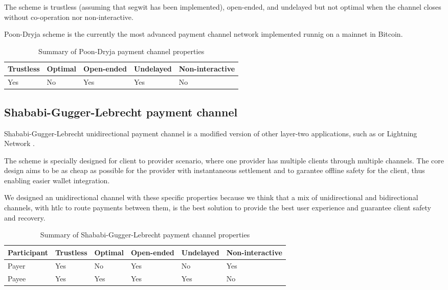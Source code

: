 \documentclass{llncs}
\begin{document}
The scheme is trustless (assuming that \gls{segwit} has been implemented), open-ended, and undelayed but not optimal when the channel closes without co-operation nor non-interactive.

Poon-Dryja scheme is the currently the most advanced payment channel network implemented runnig on a mainnet in Bitcoin.

\begin{table}[ht]
  \begin{tabularx}{\textwidth}{ | X | l | l | l | X |}
  \hline
  Trustless & Optimal & Open-ended & Undelayed & Non-interactive \\
  \hline \hline
  Yes & No & Yes & Yes & No \\
  \hline
  \end{tabularx}
  \caption{Summary of Poon-Dryja payment channel properties}
  \label{fig:summaryPoonDryjaPaymentChannel}
\end{table}

\subsection{Shababi-Gugger-Lebrecht payment channel}

Shababi-Gugger-Lebrecht unidirectional payment channel is a modified version of other layer-two applications, such as  or Lightning Network \cite{poon2016bitcoin, YoursLightningProtocol}.

The scheme is specially designed for client to provider scenario, where one provider has multiple clients through multiple channels. The core design aims to be as cheap as possible for the provider with instantaneous settlement and to garantee offline safety for the client, thus enabling easier wallet integration.

We designed an unidirectional channel with these specific properties because we think that a mix of unidirectional and bidirectional channels, with \gls{htlc} to route payments between them, is the best solution to provide the best user experience and guarantee client safety and recovery.


\begin{table}[ht]
  \begin{tabularx}{\textwidth}{ | X | l | l | l | l | l |}
  \hline
  Participant & Trustless & Optimal & Open-ended & Undelayed & Non-interactive \\
  \hline \hline
  Payer & Yes & No & Yes & No & Yes \\ \hline
  Payee & Yes & Yes & Yes & Yes & No \\
  \hline
  \end{tabularx}
  \caption{Summary of Shababi-Gugger-Lebrecht payment channel properties}
  \label{fig:summaryShababiGuggerLebrechtPaymentChannel}
\end{table}
\end{document}
